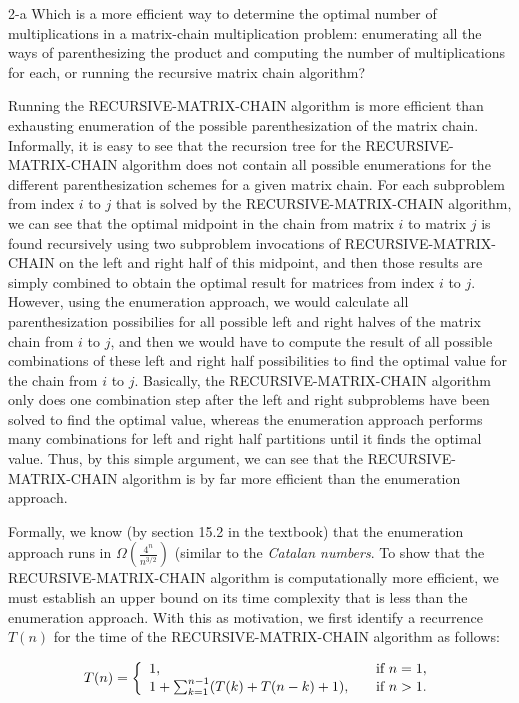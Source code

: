 \documentclass[11pt]{article}
\begin{document}
\begin{prob}{2-a}
Which is a more efficient way to determine the optimal number of multiplications in a matrix-chain multiplication problem: enumerating all the ways of parenthesizing the product and computing the number of multiplications for each, or running the recursive matrix chain algorithm?
\end{prob}
\begin{sol}
Running the RECURSIVE-MATRIX-CHAIN algorithm is more efficient than exhausting enumeration of the possible parenthesization of the matrix chain. Informally, it is easy to see that the recursion tree for the RECURSIVE-MATRIX-CHAIN algorithm does not contain all possible enumerations for the different parenthesization schemes for a given matrix chain. For each subproblem from index $i$ to $j$ that is solved by the RECURSIVE-MATRIX-CHAIN algorithm, we can see that the optimal midpoint in the chain from matrix $i$ to matrix $j$ is found recursively using two subproblem invocations of RECURSIVE-MATRIX-CHAIN on the left and right half of this midpoint, and then those results are simply combined to obtain the optimal result for matrices from index $i$ to $j$. However, using the enumeration approach, we would calculate all  parenthesization possibilies for all possible left and right halves of the matrix chain from $i$ to $j$, and then we would have to compute the result of all possible combinations of these left and right half possibilities to find the optimal value for the chain from $i$ to $j$. Basically, the RECURSIVE-MATRIX-CHAIN  algorithm only does one combination step after the left and right subproblems have been solved to find the optimal value, whereas the enumeration approach performs many combinations for left and right half partitions until it finds the optimal value. Thus, by this simple argument, we can see that the RECURSIVE-MATRIX-CHAIN algorithm is by far more efficient than the enumeration approach.

Formally, we know (by section 15.2 in the textbook) that the enumeration approach runs in $\Omega(\frac{4^n}{n^{3/2}})$ (similar to the \emph{Catalan numbers}. To show that the RECURSIVE-MATRIX-CHAIN algorithm is computationally more efficient, we must establish an upper bound on its time complexity that is less than the enumeration approach. With this as motivation, we first identify a recurrence $T(n)$ for the time of the RECURSIVE-MATRIX-CHAIN algorithm as follows:

\[
T(n) = \left\{ 
  \begin{array}{l l}
    1, & \quad \text{if $n = 1$}, \\
    1 + \sum_{k=1}^{n-1}(T(k) + T(n-k) + 1), & \quad \text{if $n > 1$}. \\
  \end{array} \right.
\]


\end{sol}
\end{document}
